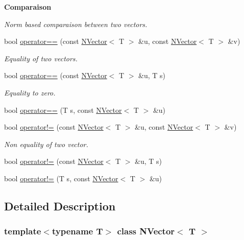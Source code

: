 \begin{Indent}\textbf{ Comparaison}\par
{\em Norm based comparaison between two vectors. }\begin{DoxyCompactItemize}
\item 
bool \mbox{\hyperlink{class_n_vector_aa1c22d1bc3a021b406c61d09f95d5e26}{operator==}} (const \mbox{\hyperlink{class_n_vector}{N\+Vector}}$<$ T $>$ \&u, const \mbox{\hyperlink{class_n_vector}{N\+Vector}}$<$ T $>$ \&v)
\begin{DoxyCompactList}\small\item\em Equality of two vectors. \end{DoxyCompactList}\item 
bool \mbox{\hyperlink{class_n_vector_aaffc8825c70b5e498690e0882d202a65}{operator==}} (const \mbox{\hyperlink{class_n_vector}{N\+Vector}}$<$ T $>$ \&u, T s)
\begin{DoxyCompactList}\small\item\em Equality to zero. \end{DoxyCompactList}\item 
bool \mbox{\hyperlink{class_n_vector_a4f2b795f34a0a21dfcc146ba02899a1b}{operator==}} (T s, const \mbox{\hyperlink{class_n_vector}{N\+Vector}}$<$ T $>$ \&u)
\item 
bool \mbox{\hyperlink{class_n_vector_adf3470a73ee508e6b7292bdaed2d13ba}{operator!=}} (const \mbox{\hyperlink{class_n_vector}{N\+Vector}}$<$ T $>$ \&u, const \mbox{\hyperlink{class_n_vector}{N\+Vector}}$<$ T $>$ \&v)
\begin{DoxyCompactList}\small\item\em Non equality of two vector. \end{DoxyCompactList}\item 
bool \mbox{\hyperlink{class_n_vector_a5f6935537ff657c5c48c14090322e851}{operator!=}} (const \mbox{\hyperlink{class_n_vector}{N\+Vector}}$<$ T $>$ \&u, T s)
\item 
bool \mbox{\hyperlink{class_n_vector_ad51fab9cb11a2faf828455d676ee6755}{operator!=}} (T s, const \mbox{\hyperlink{class_n_vector}{N\+Vector}}$<$ T $>$ \&u)
\end{DoxyCompactItemize}
\end{Indent}


\subsection{Detailed Description}
\subsubsection*{template$<$typename T$>$\newline
class N\+Vector$<$ T $>$}

